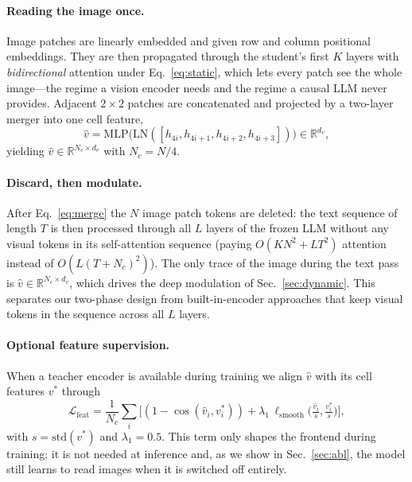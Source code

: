 \documentclass[10pt,twocolumn,letterpaper]{article}
\begin{document}
\paragraph{Reading the image once.}
Image patches are linearly embedded and given row and column positional
embeddings. They are then propagated through the student's first $K$ layers
with \emph{bidirectional} attention under Eq.~\eqref{eq:static}, which lets
every patch see the whole image---the regime a vision encoder needs and the
regime a causal LLM never provides. Adjacent $2\times2$ patches are
concatenated and projected by a two-layer merger into one cell feature,
\begin{equation}
\hat{v} = \mathrm{MLP}\big(\mathrm{LN}([h_{4i},h_{4i+1},h_{4i+2},h_{4i+3}])\big)
\in\mathbb{R}^{d_v},
\label{eq:merge}
\end{equation}
yielding $\hat{v}\in\mathbb{R}^{N_c\times d_v}$ with $N_c=N/4$.

\paragraph{Discard, then modulate.}
After Eq.~\eqref{eq:merge} the $N$ image patch tokens are deleted: the text
sequence of length $T$ is then processed through all $L$ layers of the frozen
LLM without any visual tokens in its self-attention sequence (paying
$O(K N^2 + L T^2)$ attention instead of $O(L(T+N_c)^2)$). The only trace of the
image during the text pass is $\hat{v}\in\mathbb{R}^{N_c\times d_v}$, which
drives the deep modulation of Sec.~\ref{sec:dynamic}. This separates our
two-phase design from built-in-encoder approaches that keep visual tokens in the
sequence across all $L$ layers.

\paragraph{Optional feature supervision.}
When a teacher encoder is available during training we align $\hat{v}$ with
its cell features $v^{\ast}$ through
\begin{equation}
\mathcal{L}_{\mathrm{feat}} = \frac{1}{N_c}\sum_{i}\Big[(1-\cos(\hat v_i,v^\ast_i))
+ \lambda_1\,\ell_{\mathrm{smooth}}\big(\tfrac{\hat v_i}{s},\tfrac{v^\ast_i}{s}\big)\Big],
\label{eq:feat}
\end{equation}
with $s=\mathrm{std}(v^\ast)$ and $\lambda_1{=}0.5$. This term only shapes the
frontend during training; it is not needed at inference and, as we show in
Sec.~\ref{sec:abl}, the model still learns to read images when it is
switched off entirely.
\end{document}
